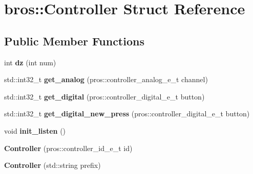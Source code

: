 \hypertarget{structbros_1_1Controller}{}\section{bros\+:\+:Controller Struct Reference}
\label{structbros_1_1Controller}
\subsection*{Public Member Functions}
\begin{DoxyCompactItemize}
\item 
\mbox{\label{structbros_1_1Controller_a5b20e5976d26a87eaf85ba5f1b93284c}} 
int {\bfseries dz} (int num)
\item 
\mbox{\label{structbros_1_1Controller_aa8aa55f1b1c2f6b443a6f327013f9597}} 
std\+::int32\+\_\+t {\bfseries get\+\_\+analog} (pros\+::controller\+\_\+analog\+\_\+e\+\_\+t channel)
\item 
\mbox{\label{structbros_1_1Controller_ac8cc51b0b7163cd24f2342da364c1d81}} 
std\+::int32\+\_\+t {\bfseries get\+\_\+digital} (pros\+::controller\+\_\+digital\+\_\+e\+\_\+t button)
\item 
\mbox{\label{structbros_1_1Controller_a6b58da7914d912bce7364b2d7023d616}} 
std\+::int32\+\_\+t {\bfseries get\+\_\+digital\+\_\+new\+\_\+press} (pros\+::controller\+\_\+digital\+\_\+e\+\_\+t button)
\item 
\mbox{\label{structbros_1_1Controller_adc54cf4a4573cd6ee8a04e374adec91b}} 
void {\bfseries init\+\_\+listen} ()
\item 
\mbox{\label{structbros_1_1Controller_aea1e0c6c6989cb9923e93b177b535532}} 
{\bfseries Controller} (pros\+::controller\+\_\+id\+\_\+e\+\_\+t id)
\item 
\mbox{\label{structbros_1_1Controller_aee92cdd4e545be07e5f05c8a5f54870a}} 
{\bfseries Controller} (std\+::string prefix)
\end{DoxyCompactItemize}
